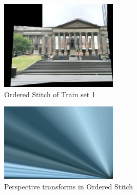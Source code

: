 \documentclass[conference]{IEEEtran}
\begin{document}
\begin{figure}[h]
  \centering
  \captionsetup{justification=centering}
  \includegraphics[width=0.5\textwidth]{phase1/set1_clear_stitch123.png}
  \caption{\label{fig:ordered_stitch}Ordered Stitch of Train set 1}
\end{figure}

\begin{figure}[h]
  \centering
  \captionsetup{justification=centering}
  \includegraphics[width=0.5\textwidth]{phase1/set2_zoomed_image3.png}
  \caption{\label{fig:zooming_perspective}Perspective transforms in Ordered Stitch }
\end{figure}
\end{document}
